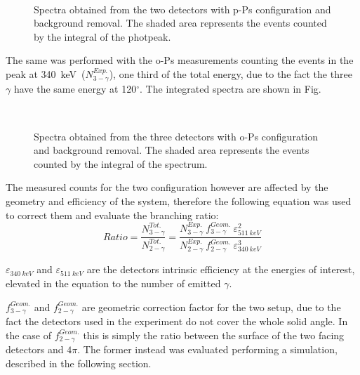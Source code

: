 \begin{figure}[H]
	\centering
	 \quad
		 \\
	\caption{Spectra obtained from the two detectors with p-Ps configuration and background removal. The shaded area represents the events counted by the integral of the photpeak. }
\label{Fig:1_2_integral}
\end{figure}
 
The same was performed with the o-Ps measurements counting the events in the peak at 340~keV~($N_{3-\gamma}^{Exp.}$), one third of the total energy, due to the fact the three $\gamma$ have the same energy at 120$^\circ$. The integrated spectra are shown in Fig.~\ 

\begin{figure}[H]
	\centering
	 \quad
		 \quad
		 \\
	\caption{Spectra obtained from the three detectors with o-Ps configuration and background removal. The shaded area represents the events counted by the integral of the spectrum. }
\label{Fig:1_2_integral}
\end{figure}

The measured counts for the two configuration however are affected by the geometry and efficiency of the system, therefore the following equation was used to correct them and evaluate the branching ratio:
\begin{equation}
Ratio=\dfrac{N_{3-\gamma}^{Tot.}}{N_{2-\gamma}^{Tot.}}=\dfrac{N_{3-\gamma}^{Exp.}\ f_{3-\gamma}^{Geom.}\ \varepsilon_{511~keV}^2}{N_{2-\gamma}^{Exp.}\ f_{2-\gamma}^{Geom.}\ \varepsilon_{340~keV}^3}
\end{equation}

$\varepsilon_{340~keV}$ and $\varepsilon_{511~keV}$ are the detectors intrinsic efficiency at the energies of interest, elevated in the equation to the number of emitted $\gamma$. 

$f_{3-\gamma}^{Geom.}$ and $f_{2-\gamma}^{Geom.}$ are geometric correction factor for the two setup, due to the fact the detectors used in the experiment do not cover the whole solid angle. In the case of $f_{2-\gamma}^{Geom.}$ this is simply the ratio between the surface of the two facing detectors and $4\pi$. The former instead was evaluated performing a simulation, described in the following section. 




